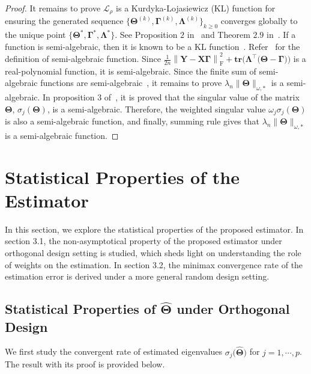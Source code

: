 \documentclass[alpha-refs]{wiley-article}
\begin{document}
\begin{proof}
It remains to prove $\mathcal{L}_{\rho}$ is a Kurdyka-Lojasiewicz (KL) function for ensuring the generated sequence
$\{\boldsymbol{\Theta}^{(k)},\boldsymbol{\Gamma}^{(k)},\boldsymbol{\Lambda}^{(k)}\}_{k \geq 0}$ converges globally to the unique point
$\{\boldsymbol{\Theta}^{*},\boldsymbol{\Gamma}^{*},\boldsymbol{\Lambda}^{*}\}$.
See Proposition $2$ in~\citet{wang2019global} and Theorem $2.9$ in~\citet{attouch2013convergence}.
If a function is semi-algebraic, then it is known to be a KL function~\citep{attouch2013convergence,sun2017global}.
Refer~\citet{sun2017global} for the definition of semi-algebraic function.
Since $\frac{1}{2n}\left\| \boldsymbol{Y}-\boldsymbol{X\Gamma} \right\|_{\text{F}}^{2}+\textbf{tr}\big( \boldsymbol{\Lambda}^{\top}\big( \boldsymbol{\Theta}-\boldsymbol{\Gamma} \big)\big)$ is a real-polynomial function, it is semi-algebraic.
Since the finite sum of semi-algebraic functions are semi-algebraic~\citep{attouch2013convergence}, it remains to prove $\lambda_{n}\|\boldsymbol{\Theta}\|_{\omega,*}$ is a semi-algebraic.
In proposition $3$ of~\citet{sun2017global}, it is proved that the singular value of the matrix $\boldsymbol{\Theta}$, $\sigma_{j}(\boldsymbol{\Theta})$, is a semi-algebraic.
Therefore, the weighted singular value $\omega_{j}\sigma_{j}(\boldsymbol{\Theta})$ is also a semi-algebraic function, and finally, summing rule gives that $\lambda_{n}\|\boldsymbol{\Theta}\|_{\omega,*}$ is a semi-algebraic function.
\end{proof}

\section{Statistical Properties of the Estimator}
In this section, we explore the statistical properties of the proposed estimator.
In section 3.1, the non-asymptotical property of the proposed estimator under orthogonal design setting is studied, which sheds light on understanding the role of weights on the estimation. In section 3.2, the minimax convergence rate of the estimation error is derived under a more general random design setting.

\subsection{Statistical Properties of $\widehat{\boldsymbol{\Theta}}$ under Orthogonal Design}
We first study the convergent rate of estimated eigenvalues $\sigma_{j}\big(\widehat{\boldsymbol{\Theta}}\big)$ for $j = 1, \cdots, p$.
The result with its proof is provided below.
\end{document}
